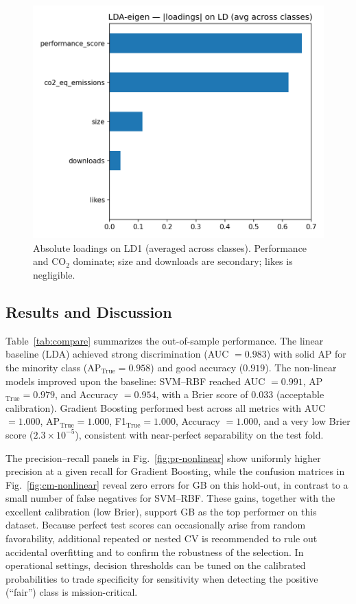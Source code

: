 \documentclass[journal]{IEEEtran}
\begin{document}
\begin{figure}[htbp]
	\centering
	\includegraphics[width=.72\linewidth]{assets/LDA-eigen_loadings_abs_bar.png}
	\caption{Absolute loadings on LD1 (averaged across classes). Performance and CO$_2$ dominate; size and downloads are secondary; likes is negligible.}
	\label{fig:lda-loadings}
\end{figure}


\subsection{Results and Discussion}
Table~\ref{tab:compare} summarizes the out-of-sample performance. The linear
baseline (LDA) achieved strong discrimination (AUC $=0.983$) with solid AP for the
minority class (AP$_{\text{True}}=0.958$) and good accuracy ($0.919$). The
non-linear models improved upon the baseline: SVM–RBF reached AUC $=0.991$,
AP$_{\text{True}}=0.979$, and Accuracy $=0.954$, with a Brier score of $0.033$
(acceptable calibration). Gradient Boosting performed best across all metrics with
AUC $=1.000$, AP$_{\text{True}}=1.000$, F1$_{\text{True}}=1.000$,
Accuracy $=1.000$, and a very low Brier score ($2.3\times10^{-5}$), consistent with
near-perfect separability on the test fold.

The precision–recall panels in Fig.~\ref{fig:pr-nonlinear} show uniformly higher
precision at a given recall for Gradient Boosting, while the confusion matrices in
Fig.~\ref{fig:cm-nonlinear} reveal zero errors for GB on this hold-out, in contrast
to a small number of false negatives for SVM–RBF. These gains, together with the
excellent calibration (low Brier), support GB as the top performer on this dataset.
Because perfect test scores can occasionally arise from random favorability,
additional repeated or nested CV is recommended to rule out accidental overfitting
and to confirm the robustness of the selection. In operational settings, decision
thresholds can be tuned on the calibrated probabilities to trade specificity for
sensitivity when detecting the positive (``fair'') class is mission-critical.
\end{document}
